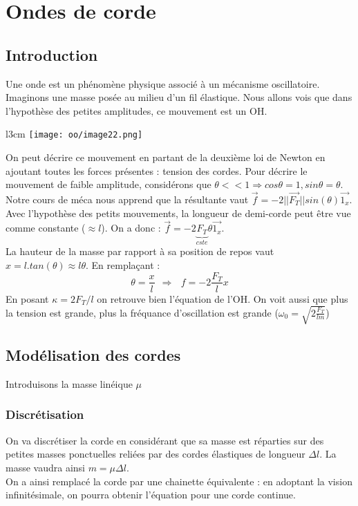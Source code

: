 \documentclass[british,french,11pt, a4paper, openany]{book}
\begin{document}
		\section{Ondes de corde}
		\subsection{Introduction}
		Une onde est un phénomène physique associé à un mécanisme oscillatoire. Imaginons une masse posée au milieu d'un fil élastique. Nous allons vois que dans l'hypothèse des petites amplitudes, ce mouvement est un OH.\\
		
		\begin{wrapfigure}[6]{l}{3cm}
			\texttt{[image: oo/image22.png]}
		\end{wrapfigure}
		
		On peut décrire ce mouvement en partant de la deuxième loi de Newton en ajoutant toutes les forces présentes : tension des cordes. Pour décrire le mouvement de faible amplitude, considérons que $\theta << 1 \Rightarrow cos\theta = 1, sin\theta = \theta$.\\
		
		Notre cours de méca nous apprend que la résultante vaut $\vec{f} = -2||\vec{F_T}||sin(\theta) \vec{1_x}$. Avec l'hypothèse des petits mouvements, la longueur de demi-corde peut être vue comme constante ($\approx l$). On a donc : $\vec{f} = -2\underbrace{F_T}_{cste}\theta\vec{1_x}$.\\
		La hauteur de la masse par rapport à sa position de repos vaut $x = l.tan(\theta) \approx l\theta$. En remplaçant :
		\begin{equation}
			\theta = \frac{x}{l}\ \ \Rightarrow\ \ \ f = -2\frac{F_T}{l}x
		\end{equation}
		En posant $\kappa = 2F_T/l$ on retrouve bien l'équation de l'OH. On voit aussi que plus la tension est grande, plus la fréquance d'oscillation est grande ($\omega_0 = \sqrt{2\frac{F_T}{lm}}$)
		
		\subsection{Modélisation des cordes}
		Introduisons la masse linéique $\mu$
		\subsubsection{Discrétisation}
		On va discrétiser la corde en considérant que sa masse est réparties sur des petites masses ponctuelles reliées par des cordes élastiques de longueur $\Delta l$. La masse vaudra ainsi $m = \mu\Delta l$.\\
		On a ainsi remplacé la corde par une chainette équivalente : en adoptant la vision infinitésimale, on pourra obtenir l'équation pour une corde continue.
		
\end{document}
